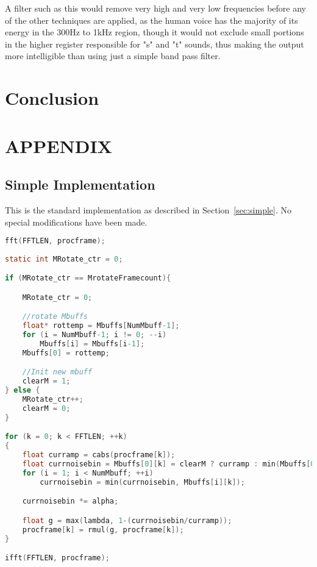 \documentclass[11pt]{article} %
\begin{document}
{A filter such as this would remove very high and very low frequencies before any of the other techniques are applied, as the human voice has the majority of its energy in the 300Hz to 1kHz region, though it would not exclude small portions in the higher register responsible for "s" and "t" sounds, thus making the output more intelligible than using just a simple band pass filter. 

\section{Conclusion} 
\clearpage

\section{APPENDIX}
\renewcommand{\thesubsection}{\Alph{subsection}}
\subsection{Simple Implementation} 
\label{app:simple}

This is the standard implementation as described in Section~\ref{sec:simple}. No special modifications have been made. 
  \begin{center}
    \begin{lstlisting}[language = C]
fft(FFTLEN, procframe);
									
static int MRotate_ctr = 0;

if (MRotate_ctr == MrotateFramecount){

	MRotate_ctr = 0;

	//rotate Mbuffs
	float* rottemp = Mbuffs[NumMbuff-1];
	for (i = NumMbuff-1; i != 0; --i)
		Mbuffs[i] = Mbuffs[i-1];
	Mbuffs[0] = rottemp;

	//Init new mbuff
	clearM = 1;
} else {
	MRotate_ctr++;
	clearM = 0;
}

for (k = 0; k < FFTLEN; ++k)
{
	float curramp = cabs(procframe[k]); 
	float currnoisebin = Mbuffs[0][k] = clearM ? curramp : min(Mbuffs[0][k], curramp);
	for (i = 1; i < NumMbuff; ++i)
		currnoisebin = min(currnoisebin, Mbuffs[i][k]);

	currnoisebin *= alpha;

	float g = max(lambda, 1-(currnoisebin/curramp));
	procframe[k] = rmul(g, procframe[k]);
}

ifft(FFTLEN, procframe);

    \end{lstlisting}
  \end{center}

}
\end{document}
